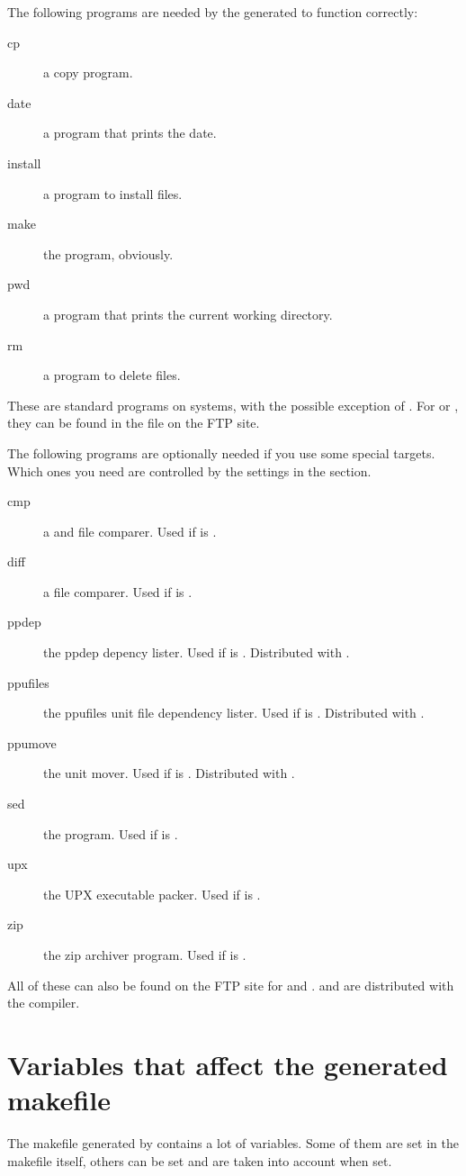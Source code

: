 The following programs are needed by the generated 
to function correctly:
\begin{description}
\item[cp] a copy program.
\item[date] a program that prints the date.
\item[install] a program to install files.
\item[make] the  program, obviously.
\item[pwd] a program that prints the current working directory.
\item[rm] a program to delete files.
\end{description}
These are standard programs on \linux systems, with the possible exception of
. For \dos or \windowsnt, they can be found in the
file  on the \fpc FTP site.

The following programs are optionally needed if you use some special targets.
Which ones you need are controlled by the settings in the  section.
\begin{description}
\item[cmp] a \dos and \windowsnt file comparer. Used if  is .
\item[diff] a file comparer. Used if  is .
\item[ppdep] the ppdep depency lister. Used if  is .
Distributed with \fpc.
\item[ppufiles] the ppufiles unit file dependency lister. Used if 
is . Distributed with \fpc.
\item[ppumove] the \fpc unit mover. Used if  is .
Distributed with \fpc.
\item[sed] the  program. Used if  is .
\item[upx] the UPX executable packer. Used if  is .
\item[zip] the zip archiver program. Used if  is .
\end{description}
All of these can also be found on the \fpc FTP site for \dos and \windowsnt.
 and  are distributed with the \fpc
compiler.

%
\section{Variables that affect the generated makefile}
The makefile generated by  contains a lot of variables.
Some of them are set in the makefile itself, others can be set and are taken
into account when set.

